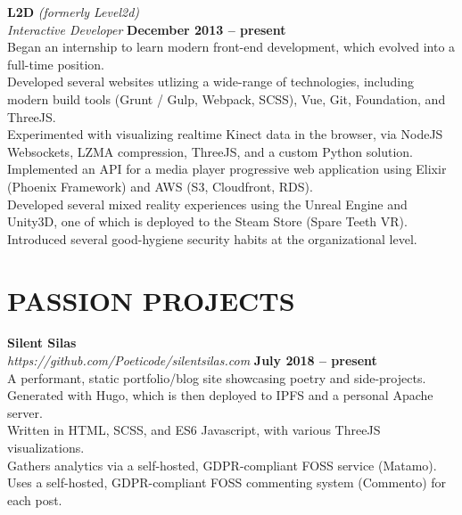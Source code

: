 \documentclass[margin,line]{resume}
\begin{document}
\begin{resume}
    \textbf{\listing L2D} \textsl{(formerly Level2d)} \vspace{2mm}\\\vspace{1mm}%
    \textsl{Interactive Developer} \hfill \textbf{December 2013 -- present}\\
    Began an internship to learn modern front-end development, which evolved into a full-time position.\\
    Developed several websites utlizing a wide-range of technologies, including modern build tools (Grunt / Gulp, Webpack, SCSS), Vue, Git, Foundation, and ThreeJS.\\
    Experimented with visualizing realtime Kinect data in the browser, via NodeJS Websockets, LZMA compression, ThreeJS, and a custom Python solution. \\
    Implemented an API for a media player progressive web application using Elixir (Phoenix Framework) and AWS (S3, Cloudfront, RDS). \\
    Developed several mixed reality experiences using the Unreal Engine and Unity3D, one of which is deployed to the Steam Store (Spare Teeth VR). \\
    Introduced several good-hygiene security habits at the organizational level.

\sectionline

    \section{\mysidestyle \textbf{\large{P}\small{ASSION} \large{P}\small{ROJECTS}}}

    \textbf{\listing Silent Silas}\\
    \textsl{https://github.com/Poeticode/silentsilas.com} \hfill \textbf{July 2018 -- present}\\
    A performant, static portfolio/blog site showcasing poetry and side-projects.\\
    Generated with Hugo, which is then deployed to IPFS and a personal Apache server.\\
    Written in HTML, SCSS, and ES6 Javascript, with various ThreeJS visualizations.\\
    Gathers analytics via a self-hosted, GDPR-compliant FOSS service (Matamo).\\
    Uses a self-hosted, GDPR-compliant FOSS commenting system (Commento) for each post. 


\end{resume}
\end{document}
